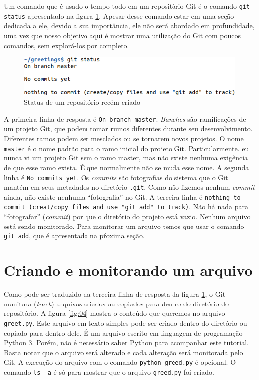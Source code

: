 \documentclass[a4paper]{book}
\begin{document}
Um comando que é usado o tempo todo em um repositório Git é o comando
\texttt{git status} apresentado na figura \ref{fig:03}.
Apesar desse comando estar em uma seção dedicada a ele, 
devido a sua importância, ele não será abordado em profundidade,
uma vez que nosso objetivo aqui é mostrar uma utilização do Git
com poucos comandos, sem explorá-los por completo.

\begin{figure}[ht]
\caption{Status de um repositório recém criado}
\label{fig:03}
\centering
\includegraphics[scale=0.6,left]{"images/03-Status de um repositório recém criado.png"}
\end{figure}

A primeira linha de resposta é \texttt{On branch master}.
\textit{Banches} são ramificações de um projeto Git, 
que podem tomar rumos diferentes durante seu desenvolvimento.
Diferentes ramos podem ser mesclados ou se tornarem novos projetos.
O nome \texttt{master} é o nome padrão para o ramo inicial do projeto Git.
Particularmente, eu nunca vi um projeto Git sem o ramo master,
mas não existe nenhuma exigência de que esse ramo exista.
É que normalmente não se muda esse nome.
%
A segunda linha é \texttt{No commits yet}.
Os \textit{commits} são fotografias do sistema que o Git mantém
em seus metadados no diretório \texttt{.git}.
Como não fizemos nenhum \textit{commit} ainda, não existe nenhuma
``fotografia'' no Git.
%
A terceira linha é 
\texttt{nothing to commit (creat/copy files and use "git add" to track)}.
Não há nada para ``fotografar'' (\textit{commit}) por que o diretório
do projeto está vazio.
Nenhum arquivo está sendo monitorado.
Para monitorar um arquivo temos que usar o comando \texttt{git add},
que é apresentado na pŕoxima seção.


\section{Criando e monitorando um arquivo}

Como pode ser traduzido da terceira linha de resposta da figura
\ref{fig:03}, o Git monitora (\textit{track}) arquivos criados
ou copiados para dentro do diretório do repositório.
A figura \ref{fig:04} mostra o conteúdo que queremos no arquivo
\texttt{greet.py}.
Este arquivo em texto simples pode ser criado dentro do diretório
ou copiado para dentro dele.
É um arquivo escrito em linguagem de programação Python 3.
Porém, não é necessário saber Python para acompanhar este tutorial.
Basta notar que o arquivo será alterado e cada alteração será monitorada
pelo Git. A execução do arquivo com o comando \texttt{python greed.py} é 
opcional. O comando \texttt{ls -a} é só para mostrar que o arquivo 
\texttt{greed.py} foi criado.
\end{document}
